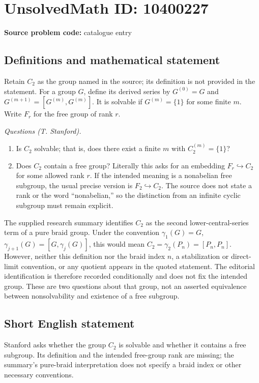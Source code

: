 \documentclass[11pt]{article}
\begin{document}
\section*{UnsolvedMath ID: 10400227}
\textbf{Source problem code:} catalogue entry
\subsection{Definitions and mathematical statement}
Retain \(C_2\) as the group named in the source; its definition is not provided in the statement. For a group \(G\), define its derived series by \(G^{(0)}=G\) and \(G^{(m+1)}=[G^{(m)},G^{(m)}]\). It is solvable if \(G^{(m)}=\{1\}\) for some finite \(m\). Write \(F_r\) for the free group of rank \(r\).

\emph{Questions (T. Stanford).}
\begin{enumerate}
\item Is \(C_2\) solvable; that is, does there exist a finite \(m\) with \(C_2^{(m)}=\{1\}\)?
\item Does \(C_2\) contain a free group? Literally this asks for an embedding \(F_r\hookrightarrow C_2\) for some allowed rank \(r\). If the intended meaning is a nonabelian free subgroup, the usual precise version is \(F_2\hookrightarrow C_2\). The source does not state a rank or the word ``nonabelian,'' so the distinction from an infinite cyclic subgroup must remain explicit.
\end{enumerate}
The supplied research summary identifies \(C_2\) as the second lower-central-series term of a pure braid group. Under the convention \(\gamma_1(G)=G\), \(\gamma_{j+1}(G)=[G,\gamma_j(G)]\), this would mean \(C_2=\gamma_2(P_n)=[P_n,P_n]\). However, neither this definition nor the braid index \(n\), a stabilization or direct-limit convention, or any quotient appears in the quoted statement. The editorial identification is therefore recorded conditionally and does not fix the intended group. These are two questions about that group, not an asserted equivalence between nonsolvability and existence of a free subgroup.
\subsection{Short English statement}
Stanford asks whether the group \(C_2\) is solvable and whether it contains a free subgroup. Its definition and the intended free-group rank are missing; the summary's pure-braid interpretation does not specify a braid index or other necessary conventions.
\end{document}
